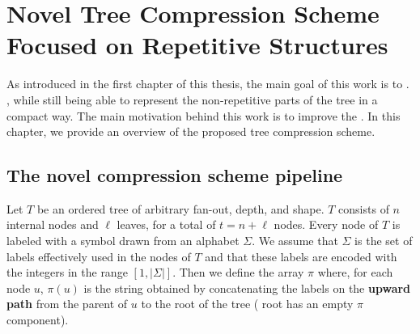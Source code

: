 \chapter{Novel Tree Compression Scheme Focused on Repetitive Structures} \label{chp:project_overview}
As introduced in the first chapter of this thesis, the main goal of this work is to . , while still being able to represent the non-repetitive parts of the tree in a compact way. The main motivation behind this work is to improve the . In this chapter, we provide an overview of the proposed tree compression scheme. 

\section{The novel compression scheme pipeline}
Let $ T $ be an ordered tree of arbitrary fan-out, depth, and shape. $ T $ consists of $ n $ internal nodes and $ \ell $ leaves, for a total of $ t = n + \ell $ nodes. Every node of $ T $ is labeled with a symbol drawn from an alphabet $ \Sigma $. We assume that $ \Sigma $ is the set of labels effectively used in the nodes of $T$ and that these labels are encoded with the integers in the range $[1, |\Sigma|]$. Then we  define the array $\pi$ where, for each node $u$, $\pi(u)$ is the string obtained by concatenating the labels on the \textbf{upward path} from the parent of $u$ to the root of the tree ( root has an empty $\pi$ component).

